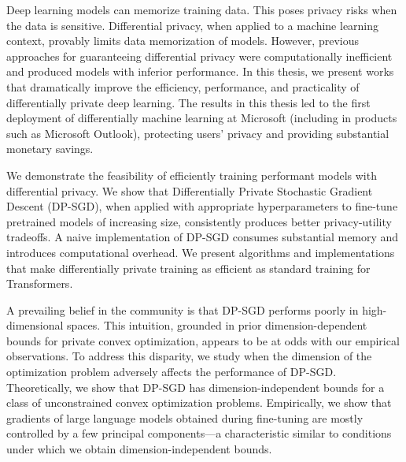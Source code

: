 
Deep learning models can memorize training data. This poses privacy risks when the data is sensitive. Differential privacy, when applied to a machine learning context, provably limits data memorization of models. 
However, previous approaches for guaranteeing differential privacy were computationally inefficient and produced models with inferior performance. In this thesis, we present works that dramatically improve the efficiency, performance, and practicality of differentially private deep learning. 
The results in this thesis led to the first deployment of differentially machine learning at Microsoft (including in products such as Microsoft Outlook), protecting users' privacy and providing substantial monetary savings.

We demonstrate the feasibility of efficiently training performant models with differential privacy. We show that Differentially Private Stochastic Gradient Descent (DP-SGD), when applied with appropriate hyperparameters to fine-tune pretrained models of increasing size, consistently produces better privacy-utility tradeoffs. A naive implementation of DP-SGD consumes substantial memory and introduces computational overhead. We present algorithms and implementations that make differentially private training as efficient as standard training for Transformers.

A prevailing belief in the community is that DP-SGD performs poorly in high-dimensional spaces. This intuition, grounded in prior dimension-dependent bounds for private convex optimization, appears to be at odds with our empirical observations. To address this disparity, we study when the dimension of the optimization problem adversely affects the performance of DP-SGD. Theoretically, we show that DP-SGD has dimension-independent bounds for a class of unconstrained convex optimization problems. Empirically, we show that gradients of large language models obtained during fine-tuning are mostly controlled by a few principal components—a characteristic similar to conditions under which we obtain dimension-independent bounds.
